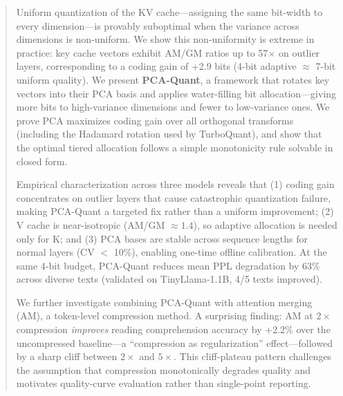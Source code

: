 \begin{abstract}
Uniform quantization of the KV cache---assigning the same bit-width to every dimension---is provably suboptimal when the variance across dimensions is non-uniform. We show this non-uniformity is extreme in practice: key cache vectors exhibit AM/GM ratios up to 57$\times$ on outlier layers, corresponding to a coding gain of +2.9 bits (4-bit adaptive $\approx$ 7-bit uniform quality). We present \textbf{PCA-Quant}, a framework that rotates key vectors into their PCA basis and applies water-filling bit allocation---giving more bits to high-variance dimensions and fewer to low-variance ones. We prove PCA maximizes coding gain over all orthogonal transforms (including the Hadamard rotation used by TurboQuant), and show that the optimal tiered allocation follows a simple monotonicity rule solvable in closed form.

Empirical characterization across three models reveals that (1) coding gain concentrates on outlier layers that cause catastrophic quantization failure, making PCA-Quant a targeted fix rather than a uniform improvement; (2) V cache is near-isotropic (AM/GM $\approx 1.4$), so adaptive allocation is needed only for K; and (3) PCA bases are stable across sequence lengths for normal layers (CV $<$ 10\%), enabling one-time offline calibration. At the same 4-bit budget, PCA-Quant reduces mean PPL degradation by 63\% across diverse texts (validated on TinyLlama-1.1B, 4/5 texts improved).

We further investigate combining PCA-Quant with attention merging (AM), a token-level compression method. A surprising finding: AM at $2\times$ compression \emph{improves} reading comprehension accuracy by +2.2\% over the uncompressed baseline---a ``compression as regularization'' effect---followed by a sharp cliff between $2\times$ and $5\times$. This cliff-plateau pattern challenges the assumption that compression monotonically degrades quality and motivates quality-curve evaluation rather than single-point reporting.
\end{abstract}
